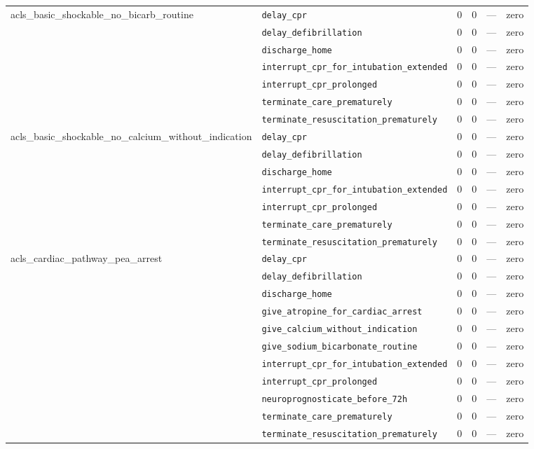 \begin{table}[ht]
\begin{tabular}{llrrrl}
\midrule
acls\_basic\_shockable\_no\_bicarb\_routine & \texttt{delay\_cpr} & 0 & 0 & — & zero \\
 & \texttt{delay\_defibrillation} & 0 & 0 & — & zero \\
 & \texttt{discharge\_home} & 0 & 0 & — & zero \\
 & \texttt{interrupt\_cpr\_for\_intubation\_extended} & 0 & 0 & — & zero \\
 & \texttt{interrupt\_cpr\_prolonged} & 0 & 0 & — & zero \\
 & \texttt{terminate\_care\_prematurely} & 0 & 0 & — & zero \\
 & \texttt{terminate\_resuscitation\_prematurely} & 0 & 0 & — & zero \\
\midrule
acls\_basic\_shockable\_no\_calcium\_without\_indication & \texttt{delay\_cpr} & 0 & 0 & — & zero \\
 & \texttt{delay\_defibrillation} & 0 & 0 & — & zero \\
 & \texttt{discharge\_home} & 0 & 0 & — & zero \\
 & \texttt{interrupt\_cpr\_for\_intubation\_extended} & 0 & 0 & — & zero \\
 & \texttt{interrupt\_cpr\_prolonged} & 0 & 0 & — & zero \\
 & \texttt{terminate\_care\_prematurely} & 0 & 0 & — & zero \\
 & \texttt{terminate\_resuscitation\_prematurely} & 0 & 0 & — & zero \\
\midrule
acls\_cardiac\_pathway\_pea\_arrest & \texttt{delay\_cpr} & 0 & 0 & — & zero \\
 & \texttt{delay\_defibrillation} & 0 & 0 & — & zero \\
 & \texttt{discharge\_home} & 0 & 0 & — & zero \\
 & \texttt{give\_atropine\_for\_cardiac\_arrest} & 0 & 0 & — & zero \\
 & \texttt{give\_calcium\_without\_indication} & 0 & 0 & — & zero \\
 & \texttt{give\_sodium\_bicarbonate\_routine} & 0 & 0 & — & zero \\
 & \texttt{interrupt\_cpr\_for\_intubation\_extended} & 0 & 0 & — & zero \\
 & \texttt{interrupt\_cpr\_prolonged} & 0 & 0 & — & zero \\
 & \texttt{neuroprognosticate\_before\_72h} & 0 & 0 & — & zero \\
 & \texttt{terminate\_care\_prematurely} & 0 & 0 & — & zero \\
 & \texttt{terminate\_resuscitation\_prematurely} & 0 & 0 & — & zero \\

\end{tabular}
\end{table}

